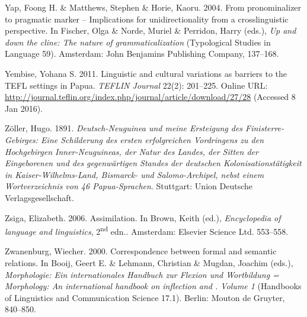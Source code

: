 \begin{styleCitaviBibliographyEntry}
Yap, Foong H. \& Matthews, Stephen \& Horie, Kaoru. 2004. From pronominalizer to pragmatic marker – Implications for unidirectionality from a crosslinguistic perspective. In Fischer, Olga \& Norde, Muriel \& Perridon, Harry (eds.), \textit{Up and down the cline: The nature of grammaticalization} (Typological Studies in Language 59). Amsterdam: John Benjamins Publishing Company, 137–168.
\end{styleCitaviBibliographyEntry}

\begin{styleCitaviBibliographyEntry}
Yembise, Yohana S. 2011. Linguistic and cultural variations as barriers to the TEFL settings in Papua. \textit{TEFLIN Journal} 22(2): 201–225. Online URL: \url{http://journal.teflin.org/index.php/journal/article/download/27/28} (Accessed 8 Jan 2016).
\end{styleCitaviBibliographyEntry}

\begin{styleCitaviBibliographyEntry}
Zöller, Hugo. 1891. \textit{Deutsch-Neuguinea und meine Ersteigung des Finisterre-Gebirges: Eine Schilderung des ersten erfolgreichen Vordringens zu den Hochgebirgen Inner-Neuguineas, der Natur des Landes, der Sitten der Eingeborenen und des gegenwärtigen Standes der deutschen Kolonisationstätigkeit in Kaiser-Wilhelms-Land, Bismarck- und Salomo-Archipel, nebst einem Wortverzeichnis von 46 Papua-Sprachen}. Stuttgart: Union Deutsche Verlagsgesellschaft.
\end{styleCitaviBibliographyEntry}

\begin{styleCitaviBibliographyEntry}
Zsiga, Elizabeth. 2006. Assimilation. In Brown, Keith (ed.), \textit{Encyclopedia of language and linguistics}, 2\textsuperscript{nd} edn.. Amsterdam: Elsevier Science Ltd. 553–558.
\end{styleCitaviBibliographyEntry}

\begin{styleCitaviBibliographyEntry}
Zwanenburg, Wiecher. 2000. Correspondence between formal and semantic relations. In Booij, Geert E. \& Lehmann, Christian \& Mugdan, Joachim (eds.), \textit{Morphologie: Ein internationales Handbuch zur Flexion und Wortbildung = Morphology: An international handbook on inflection and . Volume 1} (Handbooks of Linguistics and Communication Science 17.1). Berlin: Mouton de Gruyter, 840–850.
\end{styleCitaviBibliographyEntry}

